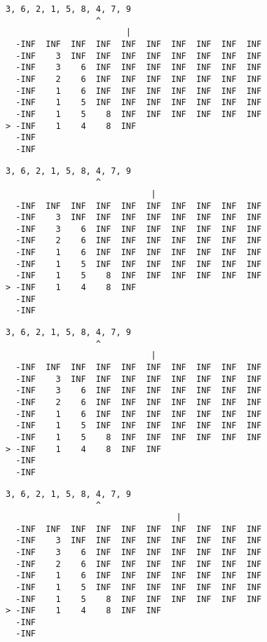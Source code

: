{ \begin{verbatim}
3, 6, 2, 1, 5, 8, 4, 7, 9
                  ^
                        |
  -INF  INF  INF  INF  INF  INF  INF  INF  INF  INF
  -INF    3  INF  INF  INF  INF  INF  INF  INF  INF
  -INF    3    6  INF  INF  INF  INF  INF  INF  INF
  -INF    2    6  INF  INF  INF  INF  INF  INF  INF
  -INF    1    6  INF  INF  INF  INF  INF  INF  INF
  -INF    1    5  INF  INF  INF  INF  INF  INF  INF
  -INF    1    5    8  INF  INF  INF  INF  INF  INF
> -INF    1    4    8  INF                         
  -INF                                             
  -INF                                             
\end{verbatim} }

{ \begin{verbatim}
3, 6, 2, 1, 5, 8, 4, 7, 9
                  ^
                             |
  -INF  INF  INF  INF  INF  INF  INF  INF  INF  INF
  -INF    3  INF  INF  INF  INF  INF  INF  INF  INF
  -INF    3    6  INF  INF  INF  INF  INF  INF  INF
  -INF    2    6  INF  INF  INF  INF  INF  INF  INF
  -INF    1    6  INF  INF  INF  INF  INF  INF  INF
  -INF    1    5  INF  INF  INF  INF  INF  INF  INF
  -INF    1    5    8  INF  INF  INF  INF  INF  INF
> -INF    1    4    8  INF                         
  -INF                                             
  -INF                                             
\end{verbatim} }

{ \begin{verbatim}
3, 6, 2, 1, 5, 8, 4, 7, 9
                  ^
                             |
  -INF  INF  INF  INF  INF  INF  INF  INF  INF  INF
  -INF    3  INF  INF  INF  INF  INF  INF  INF  INF
  -INF    3    6  INF  INF  INF  INF  INF  INF  INF
  -INF    2    6  INF  INF  INF  INF  INF  INF  INF
  -INF    1    6  INF  INF  INF  INF  INF  INF  INF
  -INF    1    5  INF  INF  INF  INF  INF  INF  INF
  -INF    1    5    8  INF  INF  INF  INF  INF  INF
> -INF    1    4    8  INF  INF                    
  -INF                                             
  -INF                                             
\end{verbatim} }

{ \begin{verbatim}
3, 6, 2, 1, 5, 8, 4, 7, 9
                  ^
                                  |
  -INF  INF  INF  INF  INF  INF  INF  INF  INF  INF
  -INF    3  INF  INF  INF  INF  INF  INF  INF  INF
  -INF    3    6  INF  INF  INF  INF  INF  INF  INF
  -INF    2    6  INF  INF  INF  INF  INF  INF  INF
  -INF    1    6  INF  INF  INF  INF  INF  INF  INF
  -INF    1    5  INF  INF  INF  INF  INF  INF  INF
  -INF    1    5    8  INF  INF  INF  INF  INF  INF
> -INF    1    4    8  INF  INF                    
  -INF                                             
  -INF                                             
\end{verbatim} }

